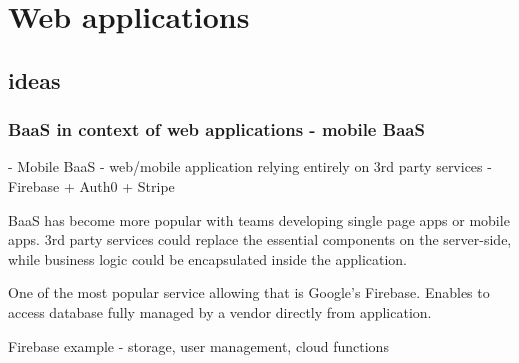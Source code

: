 \chapter{Web applications}









\section{ideas}

\subsection*{BaaS in context of web applications - mobile BaaS}

- Mobile BaaS - web/mobile application relying entirely on 3rd party services - Firebase + Auth0 + Stripe

BaaS has become more popular with teams developing single page apps or mobile apps. 3rd party services could replace the essential components on the server-side, while business logic could be encapsulated inside the application.

One of the most popular service allowing that is Google's Firebase. Enables to access database fully managed by a vendor directly from application. 

Firebase example - storage, user management, cloud functions